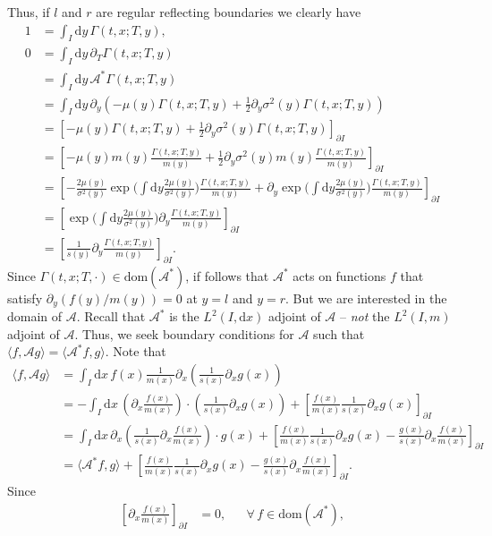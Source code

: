 \documentclass[12pt]{book}
\numberwithin{equation}{chapter}
\theoremstyle{plain}
\numberwithin{theorem}{section}
\theoremstyle{definition}
\numberwithin{exercise}{chapter}
\newcommand{\<}{\langle}
\renewcommand{\>}{\rangle}
\renewcommand{\(}{\left(}
\renewcommand{\)}{\right)}
\renewcommand{\[}{\left[}
\renewcommand{\]}{\right]}
\newcommand\Ac{\mathscr{A}}
\newcommand\sig{\sigma}
\newcommand\Gam{\Gamma}
\renewcommand\d{\partial}
\newcommand\dd{\mathrm{d}}
\begin{document}
Thus, if $l$ and $r$ are regular reflecting boundaries we clearly have
\begin{align}
1
	&=	\int_I \dd y \, \Gam(t,x;T,y) , \\
0
	&=	\int_I \dd y \, \d_T \Gam(t,x;T,y) \\
	&=	\int_I \dd y \, \Ac^* \Gam(t,x;T,y) \\
	&=	\int_I \dd y \, \d_y \( - \mu(y) \Gam(t,x;T,y) + \tfrac{1}{2} \d_y \sig^2(y) \Gam(t,x;T,y) \) \\
	&=	\[ - \mu(y) \Gam(t,x;T,y) + \tfrac{1}{2} \d_y \sig^2(y) \Gam(t,x;T,y) \]_{\d I} \\
	&=	\[ - \mu(y) m(y) \frac{\Gam(t,x;T,y)}{m(y)} + \tfrac{1}{2} \d_y \sig^2(y) m(y) \frac{\Gam(t,x;T,y)}{m(y)} \]_{\d I} \\
	&=	\[ - \frac{2 \mu(y)}{\sig^2(y)} \exp\Big( \int \dd y \frac{2 \mu(y)}{\sig^2(y)} \Big) \frac{\Gam(t,x;T,y)}{m(y)} 
				+ \d_y \exp \Big( \int \dd y \frac{2 \mu(y)}{\sig^2(y)} \Big) \frac{\Gam(t,x;T,y)}{m(y)} \]_{\d I} \\
	&=	\[ \exp \Big( \int \dd y \frac{2 \mu(y)}{\sig^2(y)} \Big) \d_y \frac{\Gam(t,x;T,y)}{m(y)} \]_{\d I} \\
	&=	\[ \frac{1}{s(y)} \d_y \frac{\Gam(t,x;T,y)}{m(y)} \]_{\d I}.
\end{align}
Since $\Gam(t,x;T,\cdot) \in \text{dom}(\Ac^*)$, if follows that $\Ac^*$ acts on functions $f$ that satisfy $\d_y(f(y)/m(y))=0$ at $y = l$ and $y=r$.  But we are interested in the domain of $\Ac$.  Recall that $\Ac^*$ is the $L^2(I,\dd x)$ adjoint of $\Ac$ -- \emph{not} the $L^2(I,m)$ adjoint of $\Ac$.  Thus, we seek boundary conditions for $\Ac$ such that $\<f, \Ac g \> = \< \Ac^* f, g\>$.  Note that
\begin{align}
\< f , \Ac g\>
	&=	\int_I \dd x \, f(x) \frac{1}{m(x)} \d_x \( \frac{1}{s(x)}\d_x g(x) \) \\
	&=	- \int_I \dd x \, \(\d_x \frac{f(x)}{m(x)} \) \cdot \( \frac{1}{s(x)}\d_x g(x) \)
			+ \[ \frac{f(x)}{m(x)} \frac{1}{s(x)} \d_x g(x) \]_{\d I} \\
	&=	\int_I \dd x \, \d_x \( \frac{1}{s(x)} \d_x \frac{f(x)}{m(x)} \) \cdot g(x)
			+ \[ \frac{f(x)}{m(x)} \frac{1}{s(x)} \d_x g(x) - \frac{g(x)}{s(x)} \d_x \frac{f(x)}{m(x)}\]_{\d I} \\
	&=	\< \Ac^* f , g \>
			+ \[ \frac{f(x)}{m(x)} \frac{1}{s(x)} \d_x g(x) - \frac{g(x)}{s(x)} \d_x \frac{f(x)}{m(x)}\]_{\d I} .
\end{align}
Since
\begin{align}
\[ \d_x \frac{f(x)}{m(x)} \]_{\d I}
	&=	0 , &
	&\forall \, f \in \text{dom}(\Ac^*) ,
\end{align}
\end{document}
